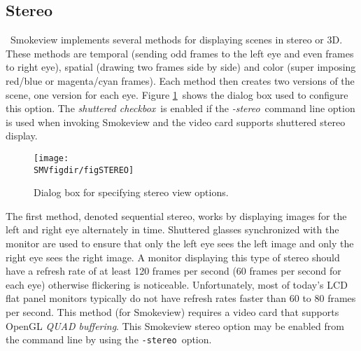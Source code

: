 \documentclass[11pt,twoside]{book}
\begin{document}
\subsection{Stereo}
\label{section:stereo}\ Smokeview implements several methods for displaying scenes in stereo or 3D. These methods are temporal (sending odd frames to the left eye and even frames to right eye), spatial (drawing two frames side by side) and color (super imposing red/blue or magenta/cyan frames).  Each method then creates two versions of the scene, one version for each eye. Figure \ref{figstereodialog}\ shows the dialog box used to configure this option.  The {\em shuttered checkbox}\ is enabled if the {\em -stereo}\ command line
option is used when invoking Smokeview and the video card supports shuttered stereo display.

\begin{figure}[bph]
\begin{center}
\texttt{[image: \\SMVfigdir/figSTEREO]}
\caption{Dialog box for specifying stereo view options.}
\label{figstereodialog}
\end{center}
\end{figure}

The first method, denoted sequential stereo, works by displaying
images for the left and right eye alternately in time.  Shuttered
glasses  synchronized with the monitor are used to ensure that
only the left eye sees the left image and only the right eye sees
the right image.  A monitor displaying this type of stereo should
have a refresh rate of at least 120 frames per second (60 frames
per second for each eye) otherwise flickering is noticeable.
Unfortunately, most of today's LCD flat panel monitors typically
do not have refresh rates faster than 60 to 80 frames per second.
This method (for Smokeview) requires a video card that supports
OpenGL {\em QUAD buffering}. This Smokeview stereo option may be
enabled from the command line by using the {\tt -stereo}\ option.
\end{document}

